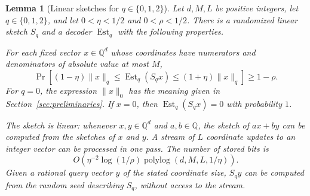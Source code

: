 \documentclass[11pt]{article}
\newtheorem{lemma}[theorem]{Lemma}
\theoremstyle{definition}
\newcommand{\Est}{\operatorname{Est}}
\newcommand{\polylog}{\operatorname{polylog}}
\begin{document}
\begin{lemma}[Linear sketches for \(q\in\{0,1,2\}\)]
\label{lem:norm-sketch}
Let \(d,M,L\) be positive integers, let \(q\in\{0,1,2\}\), and let
\(0<\eta<1/2\) and \(0<\rho<1/2\).  There is a randomized linear sketch
\(S_q\) and a decoder \(\Est_q\) with the following properties.

For each fixed vector \(x\in\mathbb{Q}^d\) whose coordinates have numerators
and denominators of absolute value at most \(M\),
\[
 \Pr\left[
  (1-\eta)\lVert x\rVert_q
  \le \Est_q(S_qx)
  \le (1+\eta)\lVert x\rVert_q
 \right]
 \ge 1-\rho.
\]
For \(q=0\), the expression \(\lVert x\rVert_0\) has the meaning given in
Section~\ref{sec:preliminaries}.  If \(x=0\), then
\(\Est_q(S_qx)=0\) with probability \(1\).

The sketch is linear: whenever \(x,y\in\mathbb{Q}^d\) and
\(a,b\in\mathbb{Q}\), the sketch of \(ax+by\) can be computed from the
sketches of \(x\) and \(y\).  A stream of \(L\) coordinate updates to an
integer vector can be processed in one pass.  The number of stored bits is
\[
 O\!\left(
  \eta^{-2}\log(1/\rho)
  \polylog(d,M,L,1/\eta)
 \right).
\]
Given a rational query vector \(y\) of the stated coordinate size, \(S_qy\)
can be computed from the random seed describing \(S_q\), without access to the
stream.
\end{lemma}
\end{document}
